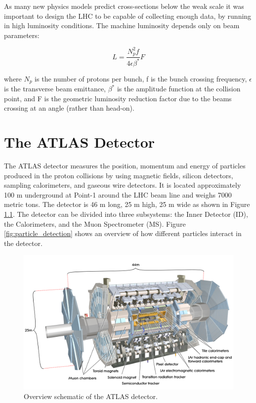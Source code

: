 As many new physics models predict cross-sections below the weak scale it was important to design the LHC to be capable of collecting enough data, by running in high luminosity conditions. The machine luminosity depends only on beam parameters:

\begin{equation}
L=\frac{N_{p}^{2}f}{4\epsilon\beta^{*}}F
\end{equation}

where $N_{p}$ is the number of protons per bunch, f is the bunch crossing frequency, $\epsilon$ is the transverse beam emittance, $\beta^{*}$ is the amplitude function at the collision point, and F is the geometric luminosity reduction factor due to the beams crossing at an angle (rather than head-on). 

\chapter{The ATLAS Detector}
The ATLAS detector measures the position, momentum and energy of particles produced in the proton collisions by using magnetic fields, silicon detectors, sampling calorimeters, and gaseous wire detectors. It is located approximately 100 m underground at Point-1 around the LHC beam line and weighs 7000 metric tons. The detector is 46 m long, 25 m high, 25 m wide  as shown in Figure \ref{fig:atlas_detectors}. The detector can be divided into three subsystems: the Inner Detector (ID), the Calorimeters, and the Muon Spectrometer (MS). Figure \ref{fig:particle_detection} shows an overview of how different particles interact in the detector.
\begin{figure}[h!]
  \centering
  \includegraphics[width=\hsize]{figures/Detector/atlas.jpg}
  \caption{Overview schematic of the ATLAS detector.} 
  \label{fig:atlas_detectors}
\end{figure}
\FloatBarrier


